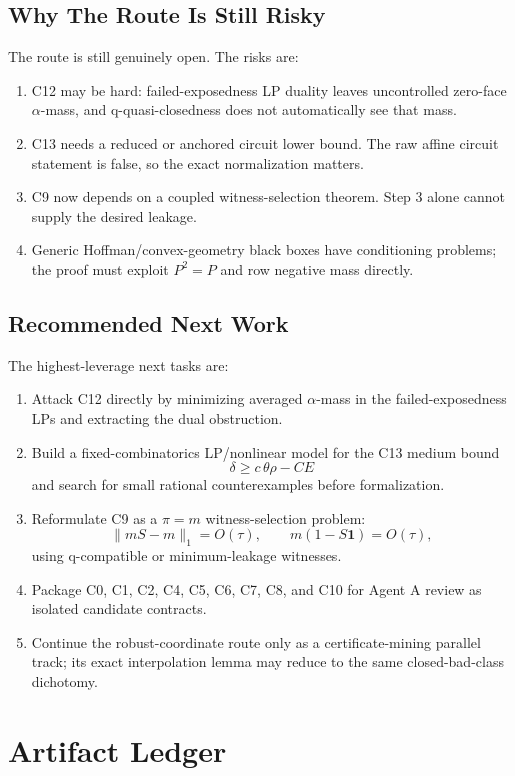 \documentclass[11pt]{article}
\newcommand{\one}{\mathbf{1}}
\theoremstyle{definition}
\begin{document}
\subsection{Why The Route Is Still Risky}

The route is still genuinely open.  The risks are:
\begin{enumerate}[label=\arabic*.]
\item C12 may be hard: failed-exposedness LP duality leaves uncontrolled
zero-face \(\alpha\)-mass, and q-quasi-closedness does not automatically see
that mass.
\item C13 needs a reduced or anchored circuit lower bound.  The raw affine
circuit statement is false, so the exact normalization matters.
\item C9 now depends on a coupled witness-selection theorem.  Step 3 alone
cannot supply the desired leakage.
\item Generic Hoffman/convex-geometry black boxes have conditioning problems;
the proof must exploit \(P^2=P\) and row negative mass directly.
\end{enumerate}

\subsection{Recommended Next Work}

The highest-leverage next tasks are:
\begin{enumerate}[label=\arabic*.]
\item Attack C12 directly by minimizing averaged \(\alpha\)-mass in the
failed-exposedness LPs and extracting the dual obstruction.
\item Build a fixed-combinatorics LP/nonlinear model for the C13 medium bound
\[
  \delta\geq c\,\theta\rho-C E
\]
and search for small rational counterexamples before formalization.
\item Reformulate C9 as a \(\pi=m\) witness-selection problem:
\[
  \|mS-m\|_1=O(\tau),\qquad m(1-S\one)=O(\tau),
\]
using q-compatible or minimum-leakage witnesses.
\item Package C0, C1, C2, C4, C5, C6, C7, C8, and C10 for Agent A review as
isolated candidate contracts.
\item Continue the robust-coordinate route only as a certificate-mining
parallel track; its exact interpolation lemma may reduce to the same
closed-bad-class dichotomy.
\end{enumerate}

\section{Artifact Ledger}
\end{document}
